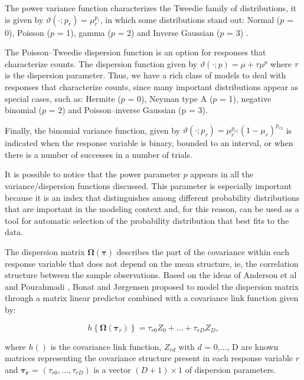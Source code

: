 \documentclass[Review,sagev,times, doublespace]{sagej}
\begin{document}
The power variance function characterizes the Tweedie family of distributions, it is given by $\vartheta\left(\cdot; p_r\right) = \mu^{p_r}_r$, in which some distributions stand out: Normal ($p $ = 0), Poisson ($p$ = 1), gamma ($p$ = 2) and Inverse Gaussian ($p$ = 3) \cite{Jorgensen87, Jorgensen97}. 

The Poisson–Tweedie dispersion function \cite{Jorgensen15} is an option for responses that characterize counts. The dispersion function given by $\vartheta\left(\cdot; p\right) = \mu + \tau\mu^p$ where $\tau$ is the dispersion parameter. Thus, we have a rich class of models to deal with responses that characterize counts, since many important distributions appear as special cases, such as: Hermite ($p$ = 0), Neyman type A ($p$ = 1), negative binomial ($p$ = 2) and Poisson–inverse Gaussian (p = $3$).

Finally, the binomial variance function, given by $\vartheta\left(\cdot; p_r\right) = \mu^{p_{r1}}_r(1 - \mu_r)^{p_{r2}}$ is indicated when the response variable is binary, bounded to an interval, or when there is a number of successes in a number of trials.

It is possible to notice that the power parameter $p$ appears in all the variance/dispersion functions discussed. This parameter is especially important because it is an index that distinguishes among different probability distributions that are important in the modeling context and, for this reason, can be used as a tool for automatic selection of the probability distribution that best fits to the data.

The dispersion matrix $\boldsymbol{\Omega({\tau})}$ describes the part of the covariance within each response variable that does not depend on the mean structure, ie, the correlation structure between the sample observations. Based on the ideas of Anderson et al \cite{Anderson73} and Pourahmadi \cite{Pourahmadi00}, Bonat and Jørgensen \cite{Bonat16} proposed to model the dispersion matrix through a matrix linear predictor combined with a covariance link function given by:

$$
h\left \{ \boldsymbol{\Omega}(\boldsymbol{\tau}_r) \right \} = \tau_{r0}Z_0 + \ldots + \tau_{rD}Z_D,
$$

\noindent where $h()$ is the covariance link function, $Z_{rd}$ with $d$ = 0,$\ldots$, D are known matrices representing the covariance structure present in each response variable $r$ and $\boldsymbol{\tau_r}$ = $(\tau_{r0}, \ldots, \tau_{rD})$ is a vector $(D + 1) \times 1$ of dispersion parameters.
\end{document}
